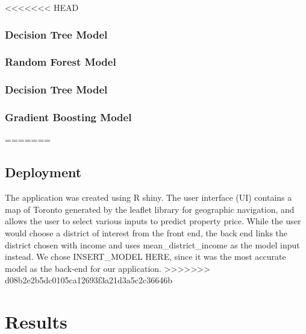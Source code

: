 \documentclass[11pt,]{article}
\begin{document}
<<<<<<< HEAD
\hypertarget{decision-tree-model}{%
\subsubsection{\texorpdfstring{\textbf{Decision Tree Model}\\
}{Decision Tree Model }}\label{decision-tree-model}}

\hypertarget{random-forest-model}{%
\subsubsection{\texorpdfstring{\textbf{Random Forest Model}\\
}{Random Forest Model }}\label{random-forest-model}}

\hypertarget{decision-tree-model-1}{%
\subsubsection{\texorpdfstring{\textbf{Decision Tree Model}\\
}{Decision Tree Model }}\label{decision-tree-model-1}}

\hypertarget{gradient-boosting-model}{%
\subsubsection{\texorpdfstring{\textbf{Gradient Boosting Model}\\
}{Gradient Boosting Model }}\label{gradient-boosting-model}}
=======
\hypertarget{deployment}{%
\subsection{Deployment}\label{deployment}}

The application was created using R shiny. The user interface (UI)
contains a map of Toronto generated by the leaflet library for
geographic navigation, and allows the user to select various inputs to
predict property price. While the user would choose a district of
interest from the front end, the back end links the district chosen with
income and uses mean\_district\_income as the model input instead. We
chose INSERT\_MODEL HERE, since it was the most accurate model as the
back-end for our application.
>>>>>>> d08b2e2b5dc0105ca12693f3a21d3a5c2c36646b

\hypertarget{results}{%
\section{Results}\label{results}}
\end{document}
